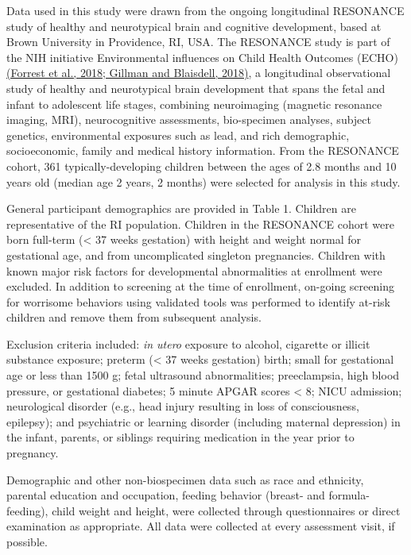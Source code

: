 \documentclass[
]{article}
\begin{document}
Data used in this study were drawn from the ongoing longitudinal
RESONANCE study of healthy and neurotypical brain and cognitive
development, based at Brown University in Providence, RI, USA. The
RESONANCE study is part of the NIH initiative Environmental influences
on Child Health Outcomes (ECHO)
\href{https://www.zotero.org/google-docs/?0tZanX}{(Forrest et al., 2018;
Gillman and Blaisdell, 2018)}, a longitudinal observational study of
healthy and neurotypical brain development that spans the fetal and
infant to adolescent life stages, combining neuroimaging (magnetic
resonance imaging, MRI), neurocognitive assessments, bio-specimen
analyses, subject genetics, environmental exposures such as lead, and
rich demographic, socioeconomic, family and medical history information.
From the RESONANCE cohort, 361 typically-developing children between the
ages of 2.8 months and 10 years old (median age 2 years, 2 months) were
selected for analysis in this study.

General participant demographics are provided in Table 1. Children are
representative of the RI population. Children in the RESONANCE cohort
were born full-term (\textless{} 37 weeks gestation) with height and
weight normal for gestational age, and from uncomplicated singleton
pregnancies. Children with known major risk factors for developmental
abnormalities at enrollment were excluded. In addition to screening at
the time of enrollment, on-going screening for worrisome behaviors using
validated tools was performed to identify at-risk children and remove
them from subsequent analysis.

Exclusion criteria included: \emph{in utero} exposure to alcohol,
cigarette or illicit substance exposure; preterm (\textless{} 37 weeks
gestation) birth; small for gestational age or less than 1500 g; fetal
ultrasound abnormalities; preeclampsia, high blood pressure, or
gestational diabetes; 5 minute APGAR scores \textless{} 8; NICU
admission; neurological disorder (e.g., head injury resulting in loss of
consciousness, epilepsy); and psychiatric or learning disorder
(including maternal depression) in the infant, parents, or siblings
requiring medication in the year prior to pregnancy.

Demographic and other non-biospecimen data such as race and ethnicity,
parental education and occupation, feeding behavior (breast- and
formula-feeding), child weight and height, were collected through
questionnaires or direct examination as appropriate. All data were
collected at every assessment visit, if possible.
\end{document}
